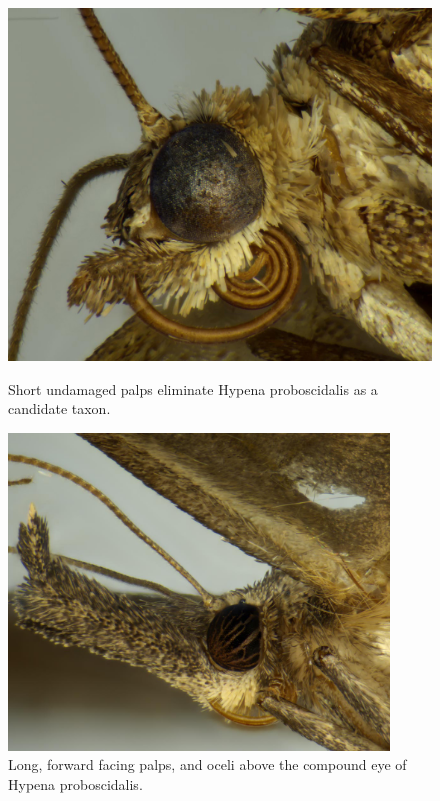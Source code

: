 \documentclass[]{article}
\begin{document}
\begin{figure}
	\centering
	\begin{minipage}{0.45\textwidth}
		\centering
	\includegraphics[width=0.9\linewidth]{202009131026PJP-4}
	\caption{Short undamaged palps eliminate Hypena proboscidalis as a candidate taxon.}
	\label{fig:20201112-1}
	\end{minipage}\hfill
	\begin{minipage}{0.45\textwidth}
		\centering
		\includegraphics[width=0.9\textwidth]{S202012271445-4} %
		\caption{Long, forward facing palps, and oceli above the compound eye of Hypena proboscidalis.}
		\label{fig:S202012271446-4}
	\end{minipage}
\end{figure}
\end{document}
